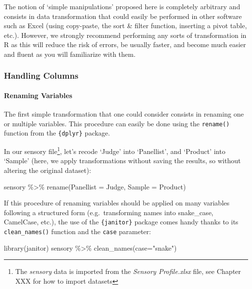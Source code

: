 \documentclass[
]{book}
\newenvironment{Shaded}{\begin{snugshade}}{\end{snugshade}}
\newcommand{\AttributeTok}[1]{\textcolor[rgb]{0.77,0.63,0.00}{#1}}
\newcommand{\FunctionTok}[1]{\textcolor[rgb]{0.00,0.00,0.00}{#1}}
\newcommand{\NormalTok}[1]{#1}
\newcommand{\SpecialCharTok}[1]{\textcolor[rgb]{0.00,0.00,0.00}{#1}}
\newcommand{\StringTok}[1]{\textcolor[rgb]{0.31,0.60,0.02}{#1}}
\begin{document}
The notion of `simple manipulations' proposed here is completely arbitrary and consists in data transformation that could easily be performed in other software such as Excel (using copy-paste, the sort \& filter function, inserting a pivot table, etc.). However, we strongly recommend performing any sorts of transformation in R as this will reduce the risk of errors, be usually faster, and become much easier and fluent as you will familiarize with them.

\hypertarget{handling-columns}{%
\subsubsection{Handling Columns}\label{handling-columns}}

\hypertarget{renaming-variables}{%
\paragraph{Renaming Variables}\label{renaming-variables}}

The first simple transformation that one could consider consists in renaming one or multiple variables.
This procedure can easily be done using the \texttt{rename()} function from the \texttt{\{dplyr\}} package.

In our sensory file\footnote{The \emph{sensory} data is imported from the \emph{Sensory Profile.xlsx} file, see Chapter XXX for how to import datasets}, let's recode `Judge' into `Panellist', and `Product' into `Sample' (here, we apply transformations without saving the results, so without altering the original dataset):

\begin{Shaded}
\begin{Highlighting}[]
\NormalTok{sensory }\SpecialCharTok{\%\textgreater{}\%} 
  \FunctionTok{rename}\NormalTok{(}\AttributeTok{Panellist =}\NormalTok{ Judge, }\AttributeTok{Sample =}\NormalTok{ Product)}
\end{Highlighting}
\end{Shaded}

If this procedure of renaming variables should be applied on many variables following a structured form (e.g.~transforming names into snake\_case, CamelCase, etc.), the use of the \texttt{\{janitor\}} package comes handy thanks to its \texttt{clean\_names()} function and the \texttt{case} parameter:

\begin{Shaded}
\begin{Highlighting}[]
\FunctionTok{library}\NormalTok{(janitor)}
\NormalTok{sensory }\SpecialCharTok{\%\textgreater{}\%} 
  \FunctionTok{clean\_names}\NormalTok{(}\AttributeTok{case=}\StringTok{"snake"}\NormalTok{)}
\end{Highlighting}
\end{Shaded}
\end{document}
